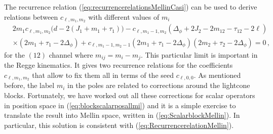 The recurrence relation (\ref{eq:recurrencerelationsMellinCasi}) can be used to derive relations between $c_{\ell,m_1,m_2}$ with different values of $m_i$
\begin{align}
   & 2 m_1 c_{\ell ,m_1,m_2} \big(d-2 (J_1+m_1+\tau _1)\big)-c_{\ell ,m_1-1,m_2} \left(\Delta _{\phi }+2 J_2-2 m_{12}-\tau _{12}-2 \ell \right)    \nonumber                       \\
   & \times\left(2 m_1+\tau _1-2 \Delta _{\phi }\right)+c_{\ell ,m_1-1,m_2-1} \left(2 m_1+\tau _1-2 \Delta _{\phi }\right) \left(2 m_2+\tau _2-2 \Delta _{\phi }\right)=0\,,
  \label{eq:RecurrencerelationMellin}
\end{align}
for the $(12)$ channel where $m_{ij}=m_i-m_j$. This particular limit is important in the Regge kinematics.
It gives  two recurrence relations for the coefficients $c_{\ell,m_1,m_2}$ that allow  to fix them all in terms of the seed $c_{\ell,0,0}$. As mentioned before, the label $m_i$ in the poles are related to corrections around the lightcone blocks.  Fortunately, we have worked out all these corrections for scalar operators in position space in (\ref{eq:blockscalarposallmi})  and it is a simple exercise to translate the result into Mellin space, written in (\ref{eq:ScalarblockMellin}). In particular, this solution is consistent with (\ref{eq:RecurrencerelationMellin}).


